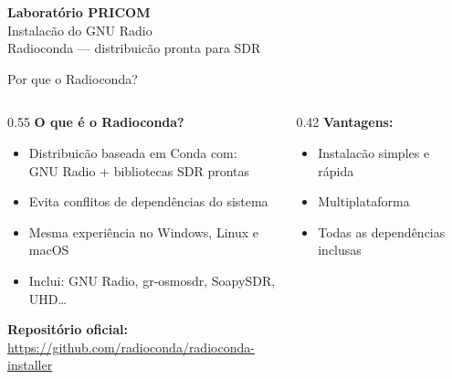 \documentclass[aspectratio=169]{beamer}
\begin{document}
{
\begin{frame}[plain,c]
\begin{center}
{\Huge\textbf{Laborat\'{o}rio PRICOM}}\\[0.8cm]
{\LARGE Instalac\~{a}o do GNU Radio}\\[0.5cm]
{\large Radioconda --- distribuic\~{a}o pronta para SDR}
\end{center}
\end{frame}
}

\begin{frame}{Por que o Radioconda?}
\begin{columns}
\begin{column}{0.55\textwidth}
  \textbf{O que \'{e} o Radioconda?}
  \begin{itemize}
    \item Distribuic\~{a}o baseada em Conda com:\\
      GNU Radio + bibliotecas SDR prontas
    \item Evita conflitos de depend\^{e}ncias do sistema
    \item Mesma experi\^{e}ncia no Windows, Linux e macOS
    \item Inclui: GNU Radio, gr-osmosdr, SoapySDR, UHD\ldots
  \end{itemize}
  \vspace{0.1cm}
  \textbf{Reposit\'{o}rio oficial:}\\
  {\footnotesize\url{https://github.com/radioconda/radioconda-installer}}
\end{column}
\begin{column}{0.42\textwidth}
  \textbf{Vantagens:}
  \begin{itemize}
    \item Instalac\~{a}o simples e r\'{a}pida
    \item Multiplataforma
    \item Todas as depend\^{e}ncias inclusas
  \end{itemize}
\end{column}
\end{columns}
\end{frame}
\end{document}

